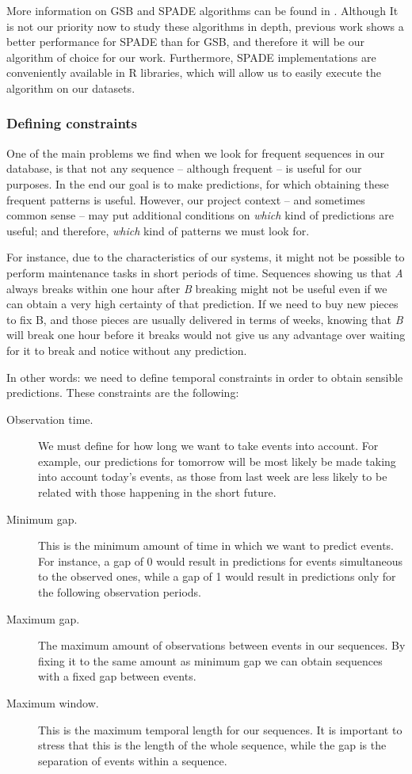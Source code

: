 \documentclass[a4paper,12pt]{article}
\begin{document}
More information on GSB and SPADE algorithms can be found in \cite{zaki2001spade, zhao2003sequential, srikant1996mining}. Although It is not our priority now to study these algorithms in depth, previous work shows a better performance for SPADE than for GSB, and therefore it will be our algorithm of choice for our work. Furthermore, SPADE implementations are conveniently available in R libraries, which will allow us to easily execute the algorithm on our datasets.

\subsubsection{Defining constraints}
One of the main problems we find when we look for frequent sequences in our database, is that not any sequence -- although frequent -- is useful for our purposes. In the end our goal is to make predictions, for which obtaining these frequent patterns is useful. However, our project context -- and sometimes common sense -- may put additional conditions on \emph{which} kind of predictions are useful; and therefore, \emph{which} kind of patterns we must look for.

For instance, due to the characteristics of our systems, it might not be possible to perform maintenance tasks in short periods of time. Sequences showing us that \emph{A} always breaks within one hour after \emph{B} breaking might not be useful even if we can obtain a very high certainty of that prediction. If we need to buy new pieces to fix B, and those pieces are usually delivered in terms of weeks, knowing that \emph{B} will break one hour before it breaks would not give us any advantage over waiting for it to break and notice without any prediction.

In other words: we need to define temporal constraints in order to obtain sensible predictions\cite{zaki2000cspade}. These constraints are the following:

\begin{description}
\item[Observation time.] We must define for how long we want to take events into account. For example, our predictions for tomorrow will be most likely be made taking into account today's events, as those from last week are less likely to be related with those happening in the short future.
\item[Minimum gap.] This is the minimum amount of time in which we want to predict events. For instance, a gap of 0 would result in predictions for events simultaneous to the observed ones, while a gap of 1 would result in predictions only for the following observation periods.
\item[Maximum gap.] The maximum amount of observations between events in our sequences. By fixing it to the same amount as minimum gap we can obtain sequences with a fixed gap between events.
\item[Maximum window.] This is the maximum temporal length for our sequences. It is important to stress that this is the length of the whole sequence, while the gap is the separation of events within a sequence.
\end{description}
\end{document}
